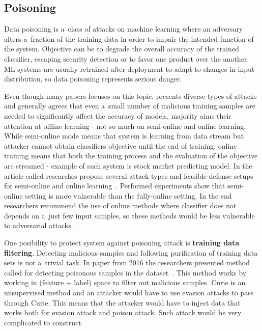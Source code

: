 \subsection{Poisoning}\label{subsec:poisoning}

Data poisoning is a~class of attacks on machine learning where an adversary alters a~fraction of the training data in order to impair the intended function of the system.
Objective can be to degrade the overall accuracy of the trained classifier, escaping security detection or to favor one product over the another.
ML systems are usually retrained after deployment to adapt to changes in input distribution, so data poisoning represents serious danger.

Even though many papers focuses on this topic, presents diverse types of attacks and generally agrees that even a~small number of malicious training samples are needed to significantly affect the accuracy of models, majority aims their attention at offline learning - not so much on semi-online and online learning.
While semi-online mode means that system is learning from data stream but attacker cannot obtain classifiers objective until the end of training, online training means that both the training process and the evaluation of the objective are streamed - example of such system is stock market predicting model.
In the article called  researches propose several attack types and feasible defense setups for semi-online and online learning~\cite{arxiv:data_poisoning_online_learning}.
Performed experiments show that semi-online setting is more vulnerable than the fully-online setting.
In the end researchers recommend the use of online methods where classifier does not depends on a~just few input samples, so these methods would be less vulnerable to adversarial attacks.

One posibility to protect system against poisoning attack is \textbf{training data filtering}.
Detecting malicious samples and following purification of training data sets is not a~trivial task.
In paper from 2016 the researchers presented method called  for detecting poisonous samples in the dataset~\cite{arxiv:curie}.
This method works by working in (feature + label) space to filter out malicious samples.
Curie is an unsupervised method and an attacker would have to use evasion attacks to pass through Curie.
This means that the attacker would have to inject data that works both for evasion attack and poison attack.
Such attack would be very complicated to construct.

